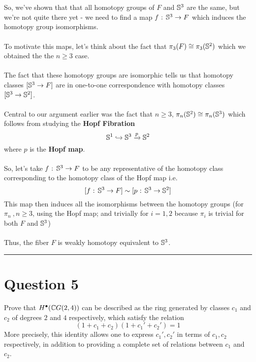 \documentclass[11pt]{article}
\begin{document}
\\
\\
So, we've shown that that all homotopy groups of $F$ and $\mathbb{S}^3$ are the same, but we're not quite there yet - we need to find a map $f \text{ : } \mathbb{S}^3 \rightarrow F$ which induces the homotopy group isomorphisms.
\\
\\
To motivate this maps, let's think about the fact that $\pi_3(F) \cong \pi_3(\mathbb{S}^2)$ which we obtained the the $n \geq 3$ case.
\\
\\
The fact that these homotopy groups are isomorphic tells us that homotopy classes $[\mathbb{S}^3 \rightarrow F]$ are in one-to-one correspondence with homotopy classes $[\mathbb{S}^3 \rightarrow \mathbb{S}^2]$.
\\
\\
Central to our argument earlier was the fact that $n \geq 3$, $\pi_n(\mathbb{S}^2) \cong \pi_n(\mathbb{S}^3)$ which follows from studying the \textbf{Hopf Fibration} $$ \mathbb{S}^1 \hookrightarrow \mathbb{S}^3 \xrightarrow{p} \mathbb{S}^2 $$ where $p$ is the \textbf{Hopf map}. 
\\
\\
So, let's take $f \text{ : } \mathbb{S}^3 \rightarrow F$ to be any representative of the homotopy class corresponding to the homotopy class of the Hopf map i.e. $$[f \text{ : } \mathbb{S}^3 \rightarrow F ] \sim [p \text{ : } \mathbb{S}^3 \rightarrow \mathbb{S}^2]$$ This map then induces all the isomorphisms between the homotopy groups (for $\pi_n~,n \geq 3$, using the Hopf map; and trivially for $i=1,2$ because $\pi_i$ is trivial for both $F$ and $\mathbb{S}^3$)
\\
\\
Thus, the fiber $F$ is weakly homotopy equivalent to $\mathbb{S}^3$.



\vskip 0.5cm
\hrule
\pagebreak




\section{Question 5}
\begin{bluebox}
  Prove that $H^{\bullet}(\mathbb{C} G(2,4))$ can be described as the ring generated by classes $c_1$ and $c_2$ of degrees $2$ and $4$ respectively, which satisfy the relation $$(1 + c_1 + c_2) (1 + c_1' + c_2') = 1$$ More precisely, this identity allows one to express $c_1', c_2'$ in terms of $c_1, c_2$ respectively, in addition to providing a complete set of relations between $c_1$ and $c_2$.
\end{bluebox}
\end{document}
